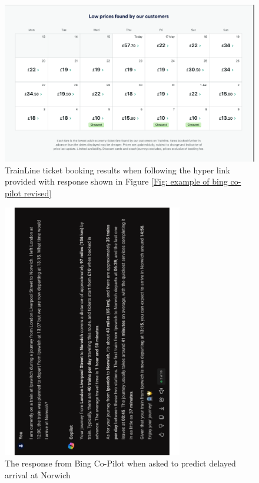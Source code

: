 \begin{figure}[!htbp]
    \centering
    \includegraphics[width=\textwidth]{Diagrams/LLM examples/Bing_Co-pilot_Train_ticket_request_Trainline-link.png}
    \caption{TrainLine ticket booking results when following the hyper link provided with response shown in Figure \ref{Fig: example of bing co-pilot revised}}
    \label{Fig: train-line booking results from bing}
\end{figure}

\begin{figure}[!htbp]
    \centering
    \includegraphics[width=0.7\textwidth, angle=270]{Diagrams/LLM examples/Bing_Co-pilot_Train_delay_prompt.pdf}
    \caption{The response from Bing Co-Pilot when asked to predict delayed arrival at Norwich}
    \label{Fig: bing copilot delay response}
\end{figure}

